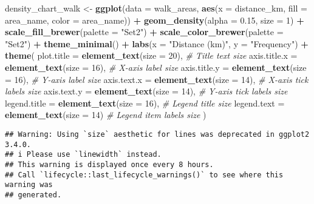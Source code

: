 \documentclass[
]{article}
\newenvironment{Shaded}{\begin{snugshade}}{\end{snugshade}}
\newcommand{\AttributeTok}[1]{\textcolor[rgb]{0.13,0.29,0.53}{#1}}
\newcommand{\CommentTok}[1]{\textcolor[rgb]{0.56,0.35,0.01}{\textit{#1}}}
\newcommand{\DecValTok}[1]{\textcolor[rgb]{0.00,0.00,0.81}{#1}}
\newcommand{\FloatTok}[1]{\textcolor[rgb]{0.00,0.00,0.81}{#1}}
\newcommand{\FunctionTok}[1]{\textcolor[rgb]{0.13,0.29,0.53}{\textbf{#1}}}
\newcommand{\NormalTok}[1]{#1}
\newcommand{\OtherTok}[1]{\textcolor[rgb]{0.56,0.35,0.01}{#1}}
\newcommand{\SpecialCharTok}[1]{\textcolor[rgb]{0.81,0.36,0.00}{\textbf{#1}}}
\newcommand{\StringTok}[1]{\textcolor[rgb]{0.31,0.60,0.02}{#1}}
\begin{document}
\begin{Shaded}
\begin{Highlighting}[]
\NormalTok{density\_chart\_walk }\OtherTok{\textless{}{-}} \FunctionTok{ggplot}\NormalTok{(}\AttributeTok{data =}\NormalTok{ walk\_areas, }\FunctionTok{aes}\NormalTok{(}\AttributeTok{x =}\NormalTok{ distance\_km, }\AttributeTok{fill =}\NormalTok{ area\_name, }\AttributeTok{color =}\NormalTok{ area\_name)) }\SpecialCharTok{+}
  \FunctionTok{geom\_density}\NormalTok{(}\AttributeTok{alpha =} \FloatTok{0.15}\NormalTok{, }\AttributeTok{size =} \DecValTok{1}\NormalTok{) }\SpecialCharTok{+} 
  \FunctionTok{scale\_fill\_brewer}\NormalTok{(}\AttributeTok{palette =} \StringTok{"Set2"}\NormalTok{) }\SpecialCharTok{+} 
  \FunctionTok{scale\_color\_brewer}\NormalTok{(}\AttributeTok{palette =} \StringTok{"Set2"}\NormalTok{) }\SpecialCharTok{+} 
  \FunctionTok{theme\_minimal}\NormalTok{() }\SpecialCharTok{+}
  \FunctionTok{labs}\NormalTok{(}\AttributeTok{x =} \StringTok{"Distance (km)"}\NormalTok{, }\AttributeTok{y =} \StringTok{"Frequency"}\NormalTok{) }\SpecialCharTok{+}
  \FunctionTok{theme}\NormalTok{(}
  \AttributeTok{plot.title =} \FunctionTok{element\_text}\NormalTok{(}\AttributeTok{size =} \DecValTok{20}\NormalTok{),       }\CommentTok{\# Title text size}
  \AttributeTok{axis.title.x =} \FunctionTok{element\_text}\NormalTok{(}\AttributeTok{size =} \DecValTok{16}\NormalTok{),      }\CommentTok{\# X{-}axis label size}
  \AttributeTok{axis.title.y =} \FunctionTok{element\_text}\NormalTok{(}\AttributeTok{size =} \DecValTok{16}\NormalTok{),      }\CommentTok{\# Y{-}axis label size}
  \AttributeTok{axis.text.x =} \FunctionTok{element\_text}\NormalTok{(}\AttributeTok{size =} \DecValTok{14}\NormalTok{),       }\CommentTok{\# X{-}axis tick labels size}
  \AttributeTok{axis.text.y =} \FunctionTok{element\_text}\NormalTok{(}\AttributeTok{size =} \DecValTok{14}\NormalTok{),       }\CommentTok{\# Y{-}axis tick labels size}
  \AttributeTok{legend.title =} \FunctionTok{element\_text}\NormalTok{(}\AttributeTok{size =} \DecValTok{16}\NormalTok{),      }\CommentTok{\# Legend title size}
  \AttributeTok{legend.text =} \FunctionTok{element\_text}\NormalTok{(}\AttributeTok{size =} \DecValTok{14}\NormalTok{)        }\CommentTok{\# Legend item labels size}
\NormalTok{  )}
\end{Highlighting}
\end{Shaded}

\begin{verbatim}
## Warning: Using `size` aesthetic for lines was deprecated in ggplot2 3.4.0.
## i Please use `linewidth` instead.
## This warning is displayed once every 8 hours.
## Call `lifecycle::last_lifecycle_warnings()` to see where this warning was
## generated.
\end{verbatim}
\end{document}
